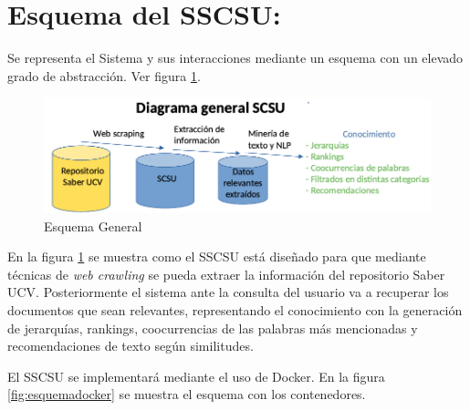\documentclass[
  10,
  openany]{book}
\begin{document}
\hypertarget{esquemas}{%
\section{Esquema del SSCSU:}\label{esquemas}}

Se representa el Sistema y sus interacciones mediante un esquema con un elevado grado de abstracción. Ver figura \ref{fig:esquema}.

\begin{figure}
\includegraphics[width=1\linewidth]{formas/diagramageneral} \caption{Esquema General}\label{fig:esquema}
\end{figure}

En la figura \ref{fig:esquema} se muestra como el SSCSU está diseñado para que mediante técnicas de \emph{web crawling} se pueda extraer la información del repositorio Saber UCV. Posteriormente el sistema ante la consulta del usuario va a recuperar los documentos que sean relevantes, representando el conocimiento con la generación de jerarquías, rankings, coocurrencias de las palabras más mencionadas y recomendaciones de texto según similitudes.

El SSCSU se implementará mediante el uso de Docker. En la figura \ref{fig:esquemadocker} se muestra el esquema con los contenedores.
\end{document}
